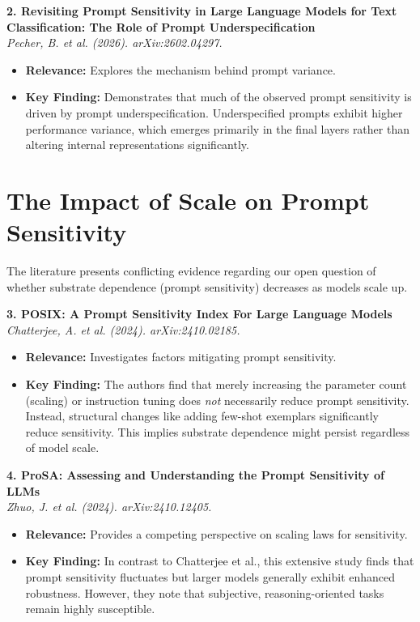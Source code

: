 \documentclass[12pt,a4paper]{article}
\begin{document}
\vspace{1em}
\noindent\textbf{2. Revisiting Prompt Sensitivity in Large Language Models for Text Classification: The Role of Prompt Underspecification}\\
\textit{Pecher, B. et al. (2026). arXiv:2602.04297.}
\begin{itemize}
    \item \textbf{Relevance:} Explores the mechanism behind prompt variance.
    \item \textbf{Key Finding:} Demonstrates that much of the observed prompt sensitivity is driven by prompt underspecification. Underspecified prompts exhibit higher performance variance, which emerges primarily in the final layers rather than altering internal representations significantly.
\end{itemize}

\section{The Impact of Scale on Prompt Sensitivity}

The literature presents conflicting evidence regarding our open question of whether substrate dependence (prompt sensitivity) decreases as models scale up.

\vspace{1em}
\noindent\textbf{3. POSIX: A Prompt Sensitivity Index For Large Language Models}\\
\textit{Chatterjee, A. et al. (2024). arXiv:2410.02185.}
\begin{itemize}
    \item \textbf{Relevance:} Investigates factors mitigating prompt sensitivity.
    \item \textbf{Key Finding:} The authors find that merely increasing the parameter count (scaling) or instruction tuning does \textit{not} necessarily reduce prompt sensitivity. Instead, structural changes like adding few-shot exemplars significantly reduce sensitivity. This implies substrate dependence might persist regardless of model scale.
\end{itemize}

\vspace{1em}
\noindent\textbf{4. ProSA: Assessing and Understanding the Prompt Sensitivity of LLMs}\\
\textit{Zhuo, J. et al. (2024). arXiv:2410.12405.}
\begin{itemize}
    \item \textbf{Relevance:} Provides a competing perspective on scaling laws for sensitivity.
    \item \textbf{Key Finding:} In contrast to Chatterjee et al., this extensive study finds that prompt sensitivity fluctuates but larger models generally exhibit enhanced robustness. However, they note that subjective, reasoning-oriented tasks remain highly susceptible.
\end{itemize}
\end{document}
